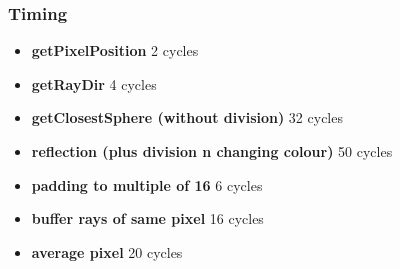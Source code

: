 \documentclass{beamer}
\begin{document}
\begin{frame}
	\frametitle{Timing}
	\begin{itemize}
		\item \textbf{getPixelPosition} 2 cycles
		\item \textbf{getRayDir} 4 cycles
		\item \textbf{getClosestSphere (without division)} 32 cycles
		\item \textbf{reflection (plus division n changing colour)} 50 cycles
		\item \textbf{padding to multiple of 16} 6 cycles
		\item \textbf{buffer rays of same pixel} 16 cycles
		\item \textbf{average pixel} 20 cycles
	\end{itemize}
\end{frame}
\end{document}

